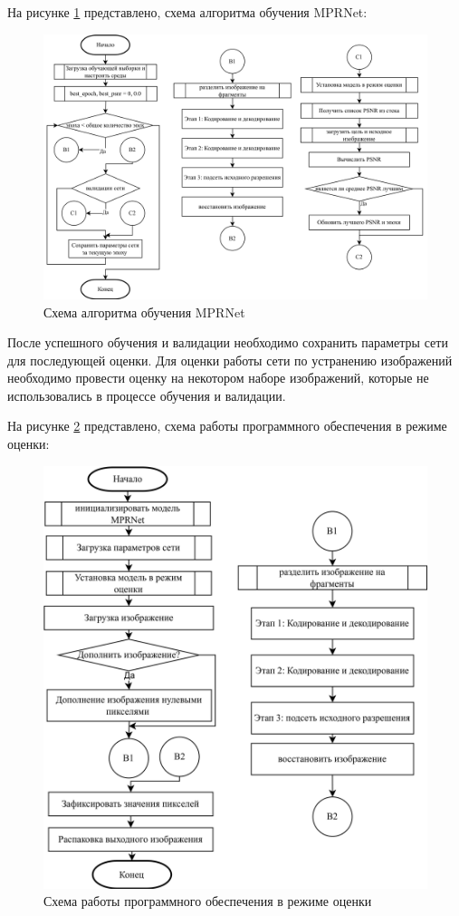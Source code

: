 На рисунке \ref{fig:training-model} представлено, схема алгоритма обучения MPRNet:
\begin{figure}[H]
	\includegraphics[width=1.0\linewidth]{assets/train-diagram.png}
	\caption{Схема алгоритма обучения MPRNet}
	\label{fig:training-model}
\end{figure}

После успешного обучения и валидации необходимо сохранить параметры сети для последующей оценки. Для оценки работы сети по устранению изображений необходимо провести оценку на некотором наборе изображений, которые не использовались в процессе обучения и валидации.

На рисунке \ref{fig:predict-model} представлено, схема работы программного обеспечения в режиме оценки:
\begin{figure}[H]
	\centering
	\includegraphics[width=1.0\linewidth]{assets/predict-diagram.png}
	\caption{Схема работы программного обеспечения в режиме оценки}
	\label{fig:predict-model}
\end{figure}

